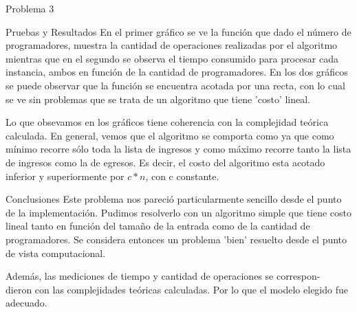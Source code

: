 \begin{section}{Problema 3}
\begin{subsection}{Pruebas y Resultados}
	En el primer gráfico se ve la función que dado el número de programadores, muestra la cantidad de operaciones realizadas por el algoritmo mientras que en el segundo se observa el tiempo consumido para procesar cada instancia, ambos en función de la cantidad de programadores.
	En los dos gráficos se puede observar que la función se encuentra acotada por una recta, con lo cual se ve sin problemas que se trata de un algoritmo que tiene 'costo' lineal.

	Lo que obsevamos en los gráficos tiene coherencia con la complejidad teórica calculada. 
	En general, vemos que el algoritmo se comporta como  ya que como mínimo recorre sólo toda la lista de ingresos y como máximo recorre tanto la lista de ingresos como la de egresos. Es decir, el costo del algoritmo esta acotado inferior y superiormente por $c*n$, con c constante.
	\end{subsection}
	\begin{subsection}{Conclusiones}
		Este problema nos pareció particularmente sencillo desde el punto de la implementación. Pudimos resolverlo con un algoritmo simple que tiene costo lineal tanto en función del tamaño de la entrada como de la cantidad de programadores. Se considera entonces un problema 'bien' resuelto desde el punto de vista computacional.

		Además, las mediciones de tiempo y cantidad de operaciones se correspon-\\dieron con las complejidades teóricas calculadas. Por lo que el modelo elegido fue adecuado.
	\end{subsection}
\end{section}







